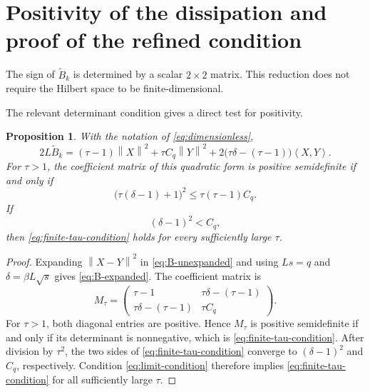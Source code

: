 \documentclass[11pt]{article}
\theoremstyle{plain}
\newtheorem{proposition}[theorem]{Proposition}
\theoremstyle{definition}
\newcommand{\norm}[1]{\left\lVert #1\right\rVert}
\newcommand{\inner}[2]{\left\langle #1,#2\right\rangle}
\begin{document}
\section{Positivity of the dissipation and proof of the refined condition}\label{sec:positivity}
The sign of $\widetilde B_k$ is determined by a scalar $2\times2$ matrix.
This reduction does not require the Hilbert space to be finite-dimensional.

The relevant determinant condition gives a direct test for positivity.

\begin{proposition}
\label{prop:positivity}
With the notation of \eqref{eq:dimensionless},
\begin{equation}
\label{eq:B-expanded}
2L\widetilde B_k
=(\tau-1)\norm{X}^2+\tau C_q\norm{Y}^2
+2\bigl(\tau\delta-(\tau-1)\bigr)\inner{X}{Y}.
\end{equation}
For $\tau>1$, the coefficient matrix of this quadratic form is positive
semidefinite if and only if
\begin{equation}
\label{eq:finite-tau-condition}
\bigl(\tau(\delta-1)+1\bigr)^2
\leq\tau(\tau-1)C_q.
\end{equation}
If
\begin{equation}
\label{eq:limit-condition}
(\delta-1)^2<C_q,
\end{equation}
then \eqref{eq:finite-tau-condition} holds for every sufficiently large
$\tau$.
\end{proposition}

\begin{proof}
Expanding $\norm{X-Y}^2$ in \eqref{eq:B-unexpanded} and using
$Ls=q$ and $\delta=\beta L\sqrt{s}$ gives \eqref{eq:B-expanded}. The
coefficient matrix is
\begin{equation}
\label{eq:M-tau}
M_\tau=
\begin{pmatrix}
\tau-1 & \tau\delta-(\tau-1)\\
\tau\delta-(\tau-1) & \tau C_q
\end{pmatrix}.
\end{equation}
For $\tau>1$, both diagonal entries are positive. Hence $M_\tau$ is
positive semidefinite if and only if its determinant is nonnegative, which
is \eqref{eq:finite-tau-condition}. After division by $\tau^2$, the two
sides of \eqref{eq:finite-tau-condition} converge to $(\delta-1)^2$ and
$C_q$, respectively. Condition \eqref{eq:limit-condition} therefore implies
\eqref{eq:finite-tau-condition} for all sufficiently large $\tau$.
\end{proof}
\end{document}
